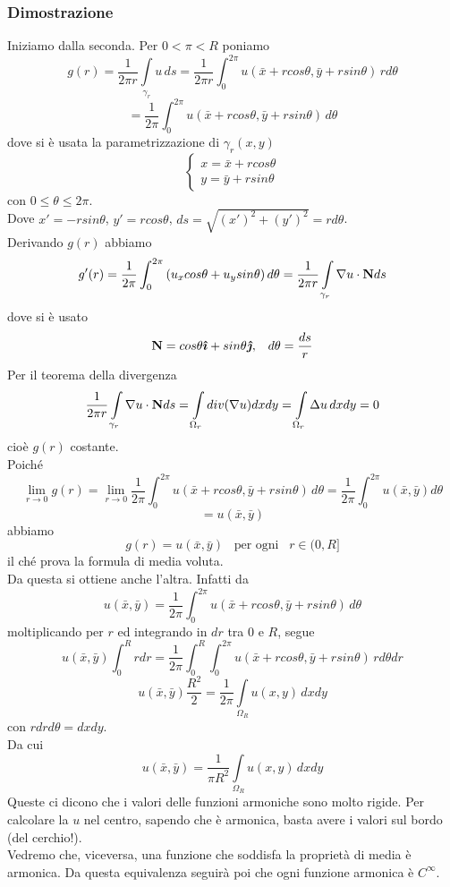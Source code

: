 \subsubsection{Dimostrazione}
Iniziamo dalla seconda. Per $0<\pi<R$ poniamo 
\[
	g(r)= \frac{1}{2\pi r}
	\int \limits_{\gamma_r}
	u \, ds=
	\frac{1}{2\pi r}
	\int_0^{2\pi}
	u(\bar{x}+rcos \theta, \bar{y} + rsin \theta) \, r d\theta
\]
\[
	= \frac{1}{2\pi}
	\int_0^{2\pi}
	u(\bar{x}+rcos \theta, \bar{y} + rsin \theta) \, d\theta
\]
dove si \`e usata la parametrizzazione di $\gamma_r(x,y)$
\[
	\left\{
		\begin{array}{l}
			x= \bar{x} + rcos\theta \\
			y= \bar{y} + rsin\theta
		\end{array}
	\right.
\]
con $0 \leq \theta \leq 2\pi$.\\
Dove $x'=-rsin \theta$, $y'= rcos \theta$, $ds= \sqrt{(x')^2+ (y')^2}= rd\theta$.\\
Derivando $g(r)$ abbiamo
\[
	g'(r)= \frac{1}{2\pi}
	\int_0^{2\pi} 
	\left(
		u_x cos\theta + u_y sin \theta
	\right)d\theta=
	\frac{1}{2\pi r}
	\int \limits_{\gamma_r} \nabla u \cdot {\bf N} ds
\]
dove si \`e usato
\[
	{\bf N} = cos\theta \boldsymbol{\hat{\imath}} + sin \theta \boldsymbol{\hat{\jmath}} , \;\;\;
	d\theta= \frac{ds}{r}
\]
Per il teorema della divergenza
\[
	\frac{1}{2\pi r}
	\int \limits_{\gamma_r} \nabla u \cdot {\bf N} ds=
	\int \limits_{\Omega_r} div (\nabla u) dxdy=
	\int \limits_{\Omega_r} \Delta u \, dxdy= 0
\]
cio\`e $g(r)$ costante.\\
Poich\'e 
\[
	\lim_{r \to 0} g(r)=
	\lim_{r \to 0} \frac{1}{2 \pi}
	\int_0^{2\pi} 
	u(\bar{x}+rcos \theta, \bar{y} + rsin \theta) \, d\theta=
	\frac{1}{2 \pi} \int_0^{2\pi}
	u(\bar{x}, \bar{y}) d\theta
\]
\[
	= u(\bar{x}, \bar{y})
\]
abbiamo
\[
	g(r)= u(\bar{x}, \bar{y}) \;\;\; \text{per ogni} \;\;\; r \in (0,R]
\]
il ch\'e prova la formula di media voluta.\\
Da questa si ottiene anche l'altra. Infatti da
\[
	u(\bar{x}, \bar{y})=
	\frac{1}{2 \pi} \int_0^{2 \pi}
	u(\bar{x}+rcos \theta, \bar{y} + rsin \theta) \, d\theta
\]
moltiplicando per $r$ ed integrando in $dr$ tra $0$ e $R$, segue
\[
	u(\bar{x}, \bar{y})\int_0^R rdr=
	\frac{1}{2\pi}\int_0^R
	\int_0^{2\pi}
	u(\bar{x}+rcos \theta, \bar{y} + rsin \theta) \, rd\theta dr
\]
\[
	u(\bar{x}, \bar{y})\frac{R^2}{2}=
	\frac{1}{2\pi} \int \limits_{\Omega_R} u(x,y) \, dxdy
\]
con $rdrd\theta= dxdy$.\\
Da cui
\[
	u(\bar{x}, \bar{y})=
	\frac{1}{\pi R^2}
	\int \limits_{\Omega_R} u(x,y) \, dxdy
\]
Queste ci dicono che i valori delle funzioni armoniche sono molto rigide.
Per calcolare la $u$ nel centro, sapendo che \`e armonica, basta avere i
valori sul bordo (del cerchio!).\\
Vedremo che, viceversa, una funzione che soddisfa la propriet\`a di media \`e
armonica. Da questa equivalenza seguir\`a poi che ogni funzione armonica \`e
$C^{\infty}$.
